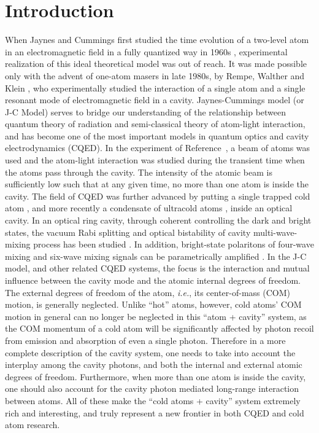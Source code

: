 \documentclass[atoms,article,accept,moreauthors,pdftex,12pt,a4paper]{mdpi}
\begin{document}
\vspace{-12pt}
\section{Introduction}

When Jaynes and Cummings first studied the time evolution of a two-level atom in an electromagnetic field in a {{ fully}} quantized way in 1960s \cite{JCM}, experimental realization of this ideal theoretical model was out of reach. It was made possible only with the advent of one-atom masers in late 1980s, by Rempe, Walther and Klein \cite{exp1987}, who experimentally studied the interaction of a single atom and a single resonant mode of electromagnetic field in a cavity. Jaynes-Cummings model (or J-C Model) serves to bridge our understanding of the relationship between quantum theory of radiation and semi-classical theory of atom-light interaction, and has become one of the most important models in quantum optics and cavity electrodynamics (CQED).
In the experiment of Reference~\cite{exp1987}, a beam of atoms was used and the atom-light interaction was studied during the transient time when the atoms pass through the cavity. The intensity of the atomic beam is sufficiently low such that at any given time, no more than one atom is inside the cavity.
The field of CQED was further advanced by putting a single trapped cold atom \cite{cavity0}, and more recently a condensate of ultracold atoms \cite{cavity1, cavity2, cavity3,Esslinger2010}, inside an optical cavity. In an optical ring cavity, through coherent controlling the dark and bright states, the vacuum Rabi splitting and optical bistability of cavity multi-wave-mixing process has been studied \cite{mixing1}. In addition, bright-state polaritons of four-wave mixing and six-wave mixing signals can be parametrically amplified \cite{mixing2}. In the J-C model, and other related CQED systems, the focus is the interaction and mutual influence between the cavity mode and the atomic internal degrees of freedom. The external degrees of freedom of the atom, \emph{i.e.}, its center-of-mass (COM) motion, is generally neglected. Unlike ``hot'' atoms, however, cold atoms' COM motion in general can no longer be neglected in this ``atom + cavity'' system, as the COM momentum of a cold atom will be significantly affected by photon recoil from emission and absorption of even a single photon. Therefore in a more complete description of the cavity system, one needs to take into account the interplay among the cavity photons, and both the internal and external atomic degrees of freedom. Furthermore, when more than one atom is inside the cavity, one should also account for the cavity photon mediated long-range interaction between atoms. All of these make the ``cold atoms + cavity'' system extremely rich and interesting, and truly represent a new frontier in both CQED and cold atom research.
\end{document}
